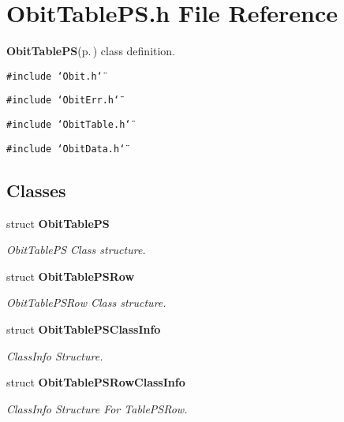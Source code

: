 \section{Obit\-Table\-PS.h File Reference}
\label{ObitTablePS_8h}
{\bf Obit\-Table\-PS}{\rm (p.\,\pageref{structObitTablePS})} class definition. 

{\tt \#include \char`\"{}Obit.h\char`\"{}}\par
{\tt \#include \char`\"{}Obit\-Err.h\char`\"{}}\par
{\tt \#include \char`\"{}Obit\-Table.h\char`\"{}}\par
{\tt \#include \char`\"{}Obit\-Data.h\char`\"{}}\par
\subsection*{Classes}
\begin{CompactItemize}
\item 
struct {\bf Obit\-Table\-PS}
\begin{CompactList}\small\item\em Obit\-Table\-PS Class structure. \item\end{CompactList}\item 
struct {\bf Obit\-Table\-PSRow}
\begin{CompactList}\small\item\em Obit\-Table\-PSRow Class structure. \item\end{CompactList}\item 
struct {\bf Obit\-Table\-PSClass\-Info}
\begin{CompactList}\small\item\em Class\-Info Structure. \item\end{CompactList}\item 
struct {\bf Obit\-Table\-PSRow\-Class\-Info}
\begin{CompactList}\small\item\em Class\-Info Structure For Table\-PSRow. \item\end{CompactList}\end{CompactItemize}
